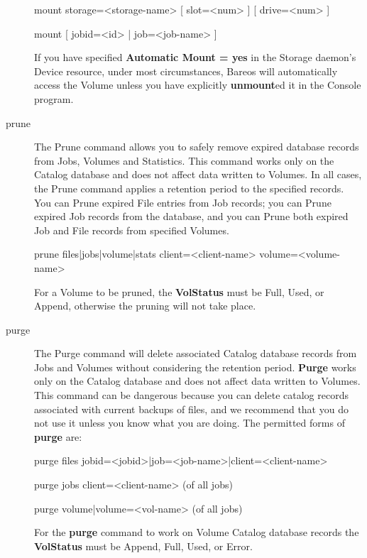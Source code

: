 \begin{description}
mount  storage={\textless}storage-name{\textgreater} [ slot={\textless}num{\textgreater} ] [
       drive={\textless}num{\textgreater} ]

mount [ jobid={\textless}id{\textgreater} |  job={\textless}job-name{\textgreater} ]

   If you have specified {\bf Automatic  Mount = yes} in the Storage daemon's
   Device resource,  under most circumstances, Bareos will automatically access
   the Volume unless you have explicitly {\bf unmount}ed it in  the Console
   program.

\item [prune]
   \label{ManualPruning}
   The Prune command allows you to safely remove expired database records from
   Jobs, Volumes and Statistics.  This command works only on the Catalog
   database and does not affect data written to Volumes.  In all cases, the
   Prune command applies a retention period to the specified records.  You can
   Prune expired File entries from Job records; you can Prune expired Job
   records from the database, and you can Prune both expired Job and File
   records from specified Volumes.

prune files|jobs|volume|stats client={\textless}client-name{\textgreater}
volume={\textless}volume-name{\textgreater}

   For a Volume to be pruned, the {\bf VolStatus} must be Full, Used, or
   Append, otherwise the pruning will not take place.

\item [purge]
   The Purge command will delete associated Catalog database records from
   Jobs and Volumes without considering the retention period.  {\bf Purge}
   works only on the Catalog database and does not affect data written to
   Volumes.  This command can be dangerous because you can delete catalog
   records associated with current backups of files, and we recommend that
   you do not use it unless you know what you are doing.  The permitted
   forms of {\bf purge} are:

purge files jobid={\textless}jobid{\textgreater}|job={\textless}job-name{\textgreater}|client={\textless}client-name{\textgreater}

purge jobs client={\textless}client-name{\textgreater} (of all jobs)

purge volume|volume={\textless}vol-name{\textgreater} (of all jobs)

For the {\bf purge} command to work on Volume Catalog database  records the
{\bf VolStatus}  must be Append, Full, Used, or Error.


\end{description}
